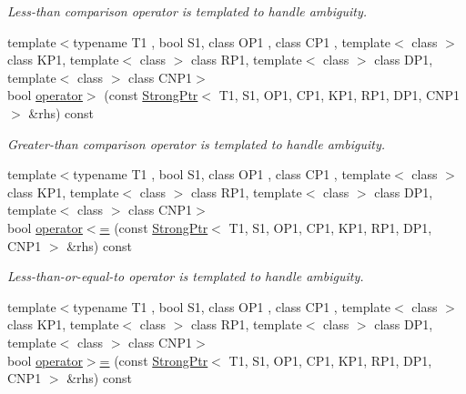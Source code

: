 \begin{DoxyCompactItemize}
\begin{DoxyCompactList}\small\item\em Less-\/than comparison operator is templated to handle ambiguity. \end{DoxyCompactList}\item 
\hypertarget{classLoki_1_1StrongPtr_aa5822444943beb1303fdfe97a9225d54}{}{\footnotesize template$<$typename T1 , bool S1, class O\+P1 , class C\+P1 , template$<$ class $>$ class K\+P1, template$<$ class $>$ class R\+P1, template$<$ class $>$ class D\+P1, template$<$ class $>$ class C\+N\+P1$>$ }\\bool \hyperlink{classLoki_1_1StrongPtr_aa5822444943beb1303fdfe97a9225d54}{operator$>$} (const \hyperlink{classLoki_1_1StrongPtr}{Strong\+Ptr}$<$ T1, S1, O\+P1, C\+P1, K\+P1, R\+P1, D\+P1, C\+N\+P1 $>$ \&rhs) const \label{classLoki_1_1StrongPtr_aa5822444943beb1303fdfe97a9225d54}

\begin{DoxyCompactList}\small\item\em Greater-\/than comparison operator is templated to handle ambiguity. \end{DoxyCompactList}\item 
\hypertarget{classLoki_1_1StrongPtr_a338c8eecc8dab4e2ffecf5cf2589dc03}{}{\footnotesize template$<$typename T1 , bool S1, class O\+P1 , class C\+P1 , template$<$ class $>$ class K\+P1, template$<$ class $>$ class R\+P1, template$<$ class $>$ class D\+P1, template$<$ class $>$ class C\+N\+P1$>$ }\\bool \hyperlink{classLoki_1_1StrongPtr_a338c8eecc8dab4e2ffecf5cf2589dc03}{operator$<$=} (const \hyperlink{classLoki_1_1StrongPtr}{Strong\+Ptr}$<$ T1, S1, O\+P1, C\+P1, K\+P1, R\+P1, D\+P1, C\+N\+P1 $>$ \&rhs) const \label{classLoki_1_1StrongPtr_a338c8eecc8dab4e2ffecf5cf2589dc03}

\begin{DoxyCompactList}\small\item\em Less-\/than-\/or-\/equal-\/to operator is templated to handle ambiguity. \end{DoxyCompactList}\item 
\hypertarget{classLoki_1_1StrongPtr_a91af3158cc77af31358af50c02a198e1}{}{\footnotesize template$<$typename T1 , bool S1, class O\+P1 , class C\+P1 , template$<$ class $>$ class K\+P1, template$<$ class $>$ class R\+P1, template$<$ class $>$ class D\+P1, template$<$ class $>$ class C\+N\+P1$>$ }\\bool \hyperlink{classLoki_1_1StrongPtr_a91af3158cc77af31358af50c02a198e1}{operator$>$=} (const \hyperlink{classLoki_1_1StrongPtr}{Strong\+Ptr}$<$ T1, S1, O\+P1, C\+P1, K\+P1, R\+P1, D\+P1, C\+N\+P1 $>$ \&rhs) const \label{classLoki_1_1StrongPtr_a91af3158cc77af31358af50c02a198e1}


\end{DoxyCompactItemize}
